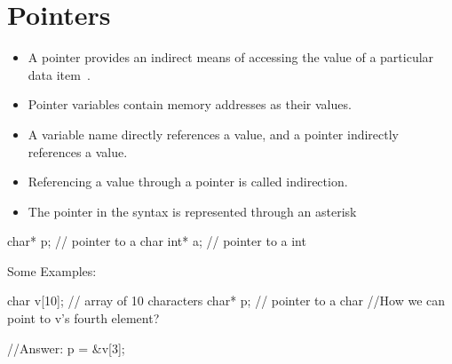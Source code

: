 \section{Pointers}
\label{sec:Pointers}

\begin{itemize}
    \item A pointer provides an indirect means of accessing the value of a particular data item~\cite{kochan2005programmingC}. 
    \item Pointer variables contain memory addresses as their values. 
    \item A variable name directly references a value, and a pointer indirectly references a value.
    \item Referencing a value through a pointer is called indirection.
    \item The pointer in the syntax is represented through an asterisk \textquotesingle\CppCommonCode{*}\textquotesingle
\end{itemize}

\begin{minipage}{\MPWxXSSxLISTING\textwidth} %
{} %
\begin{CPPCode}
char* p;        // pointer to a char
int*  a;        // pointer to a int
\end{CPPCode}
\end{minipage}

\noindent Some Examples:\\
\begin{minipage}{\MPWxXSxLISTING\textwidth} %
{} %
\begin{CPPCode}
char v[10];     // array of 10 characters
char* p;        // pointer to a char
//How we can point to v's fourth element?
\end{CPPCode}
\end{minipage}
\begin{minipage}{\MPWxXXSxLISTING\textwidth} %
{} %
\begin{CPPCode}
//Answer:
p = &v[3];
\end{CPPCode}
\end{minipage}

